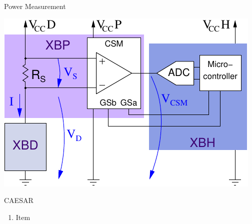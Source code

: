 \documentclass[xcolor=pdftex,dvipsnames,table,final]{beamer}
\begin{document}
\begin{frame}[fragile]{}
\begin{columns}[t, totalwidth=\textwidth]
\begin{column}{.675\linewidth}
\begin{columns}
\begin{column}{.473\linewidth}
\begin{block}{Power Measurement}
\begin{minipage}{0.48\linewidth}
          \begin{center}
            \vspace{-2ex}
            \includegraphics[scale=1.45]{../figures/ina225}
          \end{center} 
	\end{minipage} 
       \end{block}
       \begin{block}{CAESAR}
        \begin{enumerate}
          \item Item
        \end{enumerate}
       \end{block}


\end{column}
\end{columns}
\end{column}
\end{columns}
\end{frame}
\end{document}
